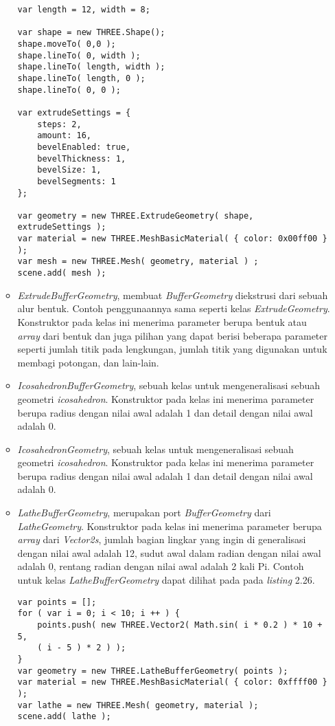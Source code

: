 \begin{itemize}
\begin{itemize}
\begin{lstlisting}[caption={Contoh penggunaan kelas {\it ExtrudeGeometry}.},captionpos=b]
var length = 12, width = 8;

var shape = new THREE.Shape();
shape.moveTo( 0,0 );
shape.lineTo( 0, width );
shape.lineTo( length, width );
shape.lineTo( length, 0 );
shape.lineTo( 0, 0 );

var extrudeSettings = {
	steps: 2,
	amount: 16,
	bevelEnabled: true,
	bevelThickness: 1,
	bevelSize: 1,
	bevelSegments: 1
};

var geometry = new THREE.ExtrudeGeometry( shape, extrudeSettings );
var material = new THREE.MeshBasicMaterial( { color: 0x00ff00 } );
var mesh = new THREE.Mesh( geometry, material ) ;
scene.add( mesh );
\end{lstlisting}

	\item {\it ExtrudeBufferGeometry}, membuat {\it BufferGeometry} diekstrusi dari sebuah alur bentuk. Contoh penggunaannya sama seperti kelas {\it ExtrudeGeometry}. Konstruktor pada kelas ini menerima parameter berupa bentuk atau {\it array} dari bentuk dan juga pilihan yang dapat berisi beberapa parameter seperti jumlah titik pada lengkungan, jumlah titik yang digunakan untuk membagi potongan, dan lain-lain.

	\item {\it IcosahedronBufferGeometry}, sebuah kelas untuk mengeneralisasi sebuah geometri {\it icosahedron}. Konstruktor pada kelas ini menerima parameter berupa radius dengan nilai awal adalah 1 dan detail dengan nilai awal adalah 0.

	\item {\it IcosahedronGeometry}, sebuah kelas untuk mengeneralisasi sebuah geometri {\it icosahedron}. Konstruktor pada kelas ini menerima parameter berupa radius dengan nilai awal adalah 1 dan detail dengan nilai awal adalah 0.

	\item {\it LatheBufferGeometry}, merupakan port {\it BufferGeometry} dari {\it LatheGeometry}. Konstruktor pada kelas ini menerima parameter berupa {\it array} dari {\it Vector2s}, jumlah bagian lingkar yang ingin di generalisasi dengan nilai awal adalah 12, sudut awal dalam radian dengan nilai awal adalah 0, rentang radian dengan nilai awal adalah 2 kali Pi. Contoh untuk kelas {\it LatheBufferGeometry} dapat dilihat pada pada {\it listing} 2.26.
	
\begin{lstlisting}[caption={Contoh penggunaan kelas {\it LatheBufferGeometry}.},captionpos=b]
var points = [];
for ( var i = 0; i < 10; i ++ ) {
	points.push( new THREE.Vector2( Math.sin( i * 0.2 ) * 10 + 5,
	( i - 5 ) * 2 ) );
}
var geometry = new THREE.LatheBufferGeometry( points );
var material = new THREE.MeshBasicMaterial( { color: 0xffff00 } );
var lathe = new THREE.Mesh( geometry, material );
scene.add( lathe );
\end{lstlisting}


\end{itemize}
\end{itemize}
